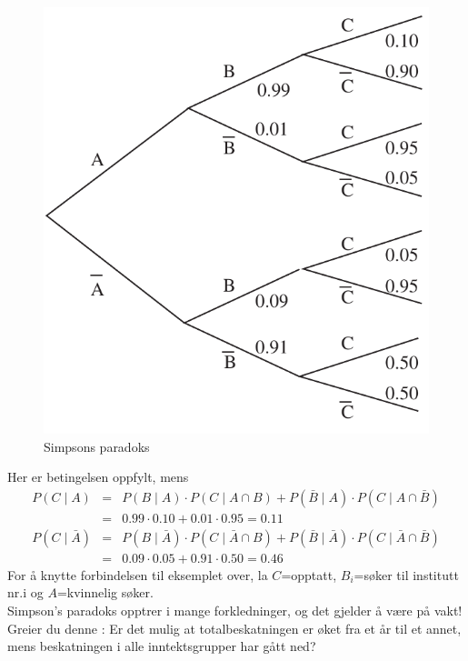 \begin{figure}[ht]
\centering \centering
 \includegraphics[scale=0.7]{figurer/fig4_4.pdf} 
 \caption{Simpsons paradoks}
	\label{fig:simpsons_paradoks}
\end{figure}

Her er betingelsen oppfylt, mens
\begin{eqnarray*}
P(C\mid A)&=&P(B\mid A) \cdot P(C\mid A\cap B)
                +P(\bar{B}\mid A) \cdot P(C\mid A\cap \bar{B}) \\
          &=&0.99 \cdot 0.10 + 0.01 \cdot 0.95 = 0.11 \\
P(C\mid \bar{A})&=&P(B\mid \bar{A}) \cdot P(C\mid \bar{A}\cap B)
                +P(\bar{B}\mid \bar{A}) \cdot P(C\mid \bar{A}\cap \bar{B}) \\
          &=&0.09 \cdot 0.05 + 0.91 \cdot 0.50 = 0.46 
\end{eqnarray*}
For å knytte forbindelsen til eksemplet over, la $C$=opptatt,
$B_i$=søker til institutt nr.i og $A$=kvinnelig søker.
\mbox{} \\

Simpson's paradoks opptrer i mange forkledninger, og det gjelder å
være på vakt! Greier du denne :  Er det mulig at totalbeskatningen
er øket fra et år til et annet, mens beskatningen i alle
inntektsgrupper har gått ned?


